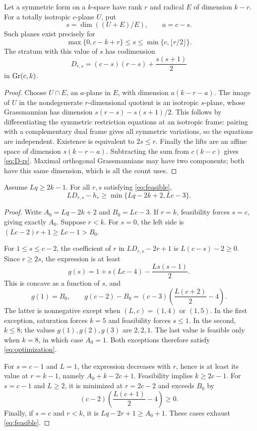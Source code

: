 \begin{lemma}\label{lem:isotropic}
Let a symmetric form on a $k$-space have rank $r$ and radical $E$ of dimension $k-r$. For a totally isotropic $c$-plane $U$, put
\[
 s=\dim((U+E)/E),\qquad a=c-s.
\]
Such planes exist precisely for
\begin{equation}\label{eq:feasible}
 \max\{0,c-k+r\}\le s\le\min\{c,\lfloor r/2\rfloor\}.
\end{equation}
The stratum with this value of $s$ has codimension
\begin{equation}\label{eq:D-rs}
 D_{r,s}=(c-s)(r-s)+\frac{s(s+1)}2
\end{equation}
in $\operatorname{Gr}(c,k)$.
\end{lemma}
\begin{proof}
Choose $U\cap E$, an $a$-plane in $E$, with dimension $a(k-r-a)$. The image of $U$ in the nondegenerate $r$-dimensional quotient is an isotropic $s$-plane, whose Grassmannian has dimension $s(r-s)-s(s+1)/2$. This follows by differentiating the symmetric restriction equations at an isotropic frame: pairing with a complementary dual frame gives all symmetric variations, so the equations are independent. Existence is equivalent to $2s\le r$. Finally the lifts are an affine space of dimension $s(k-r-a)$. Subtracting the sum from $c(k-c)$ gives \eqref{eq:D-rs}. Maximal orthogonal Grassmannians may have two components; both have this same dimension, which is all the count uses.
\end{proof}

\begin{lemma}\label{lem:optimization}
Assume $Lq\ge2k-1$. For all $r,s$ satisfying \eqref{eq:feasible},
\begin{equation}\label{eq:optimization}
 L D_{r,s}-h_r\ge\min\{Lq-2k+2,Lc-3\}.
\end{equation}
\end{lemma}
\begin{proof}
Write $A_0=Lq-2k+2$ and $B_0=Lc-3$. If $r=k$, feasibility forces $s=c$, giving exactly $A_0$. Suppose $r<k$. For $s=0$, the left side is $(Lc-2)r+1\ge Lc-1>B_0$.

For $1\le s\le c-2$, the coefficient of $r$ in $L D_{r,s}-2r+1$ is $L(c-s)-2\ge0$. Since $r\ge2s$, the expression is at least
\[
 g(s)=1+s(Lc-4)-\frac{Ls(s-1)}2.
\]
This is concave as a function of $s$, and
\[
 g(1)=B_0,\qquad
 g(c-2)-B_0=(c-3)\left(\frac{L(c+2)}2-4\right).
\]
The latter is nonnegative except when $(L,c)=(1,4)$ or $(1,5)$. In the first exception, saturation forces $k=5$ and feasibility forces $s\le1$. In the second, $k\le8$; the values $g(1),g(2),g(3)$ are $2,2,1$. The last value is feasible only when $k=8$, in which case $A_0=1$. Both exceptions therefore satisfy \eqref{eq:optimization}.

For $s=c-1$ and $L=1$, the expression decreases with $r$, hence is at least its value at $r=k-1$, namely $A_0+k-2c+1$. Feasibility implies $k\ge2c-1$. For $s=c-1$ and $L\ge2$, it is minimized at $r=2c-2$ and exceeds $B_0$ by
\[
 (c-2)\left(\frac{L(c+1)}2-4\right)\ge0.
\]
Finally, if $s=c$ and $r<k$, it is $Lq-2r+1\ge A_0+1$. These cases exhaust \eqref{eq:feasible}.
\end{proof}

